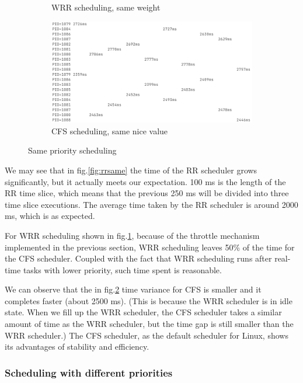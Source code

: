 \documentclass[11pt]{article}
\begin{document}
\begin{figure}[ht]
\begin{subfigure}{.5\textwidth}
    \caption{WRR scheduling, same weight}
    \label{fig:wrrsame}
  \end{subfigure}
  \begin{subfigure}{.5\textwidth}
    \centering
    \includegraphics[width=\textwidth]{CFS-example.png}
    \caption{CFS scheduling, same nice value}
    \label{fig:cfssame}
  \end{subfigure}
  \caption{Same priority scheduling}
  \label{fig:same}
  \end{figure}


We may see that in fig.\ref{fig:rrsame} 
the time of the RR scheduler grows significantly, but it actually meets
our expectation. 100 ms is the length of the RR time slice, which means
that the previous 250 ms will be divided into three time slice
executions. The average time taken by the RR scheduler is around 2000
ms, which is as expected.


For WRR scheduling shown in fig.\ref{fig:wrrsame}, because of the throttle mechanism implemented in the
previous section, WRR scheduling leaves 50\% of the time for the CFS
scheduler. Coupled with the fact that WRR scheduling runs after
real-time tasks with lower priority, such time spent is reasonable.


We can observe that the in fig.\ref{fig:cfssame} time variance for CFS is smaller and it
completes faster (about 2500 ms). (This is because the WRR scheduler is
in idle state. When we fill up the WRR scheduler, the CFS scheduler takes
a similar amount of time as the WRR scheduler, but the time gap is still
smaller than the WRR scheduler.) The CFS scheduler, as the default
scheduler for Linux, shows its advantages of stability and efficiency.

\subsubsection{Scheduling with different priorities}
\end{document}
